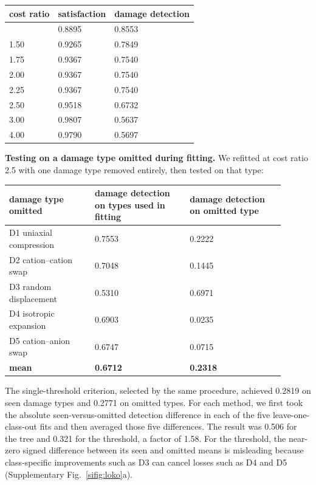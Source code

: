 {\def\LTcaptype{none} %
\begin{longtable}[]{@{}lll@{}}
\toprule\noalign{}
cost ratio & satisfaction & damage detection \\
\midrule\noalign{}
\endhead
\bottomrule\noalign{}
\endlastfoot
1.00 & 0.8895 & 0.8553 \\
1.50 & 0.9265 & 0.7849 \\
1.75 & 0.9367 & 0.7540 \\
2.00 & 0.9367 & 0.7540 \\
2.25 & 0.9367 & 0.7540 \\
2.50 & 0.9518 & 0.6732 \\
3.00 & 0.9807 & 0.5637 \\
4.00 & 0.9790 & 0.5697 \\
\end{longtable}
}

\textbf{Testing on a damage type omitted during fitting.} We refitted at cost ratio 2.5
with one damage type removed entirely, then tested on that type:

{\def\LTcaptype{none} %
\begin{longtable}[]{@{}p{0.28\linewidth}p{0.31\linewidth}p{0.31\linewidth}@{}}
\toprule\noalign{}
damage type omitted & damage detection on types used in fitting & damage detection on omitted type \\
\midrule\noalign{}
\endhead
\bottomrule\noalign{}
\endlastfoot
D1 uniaxial compression & 0.7553 & 0.2222 \\
D2 cation--cation swap & 0.7048 & 0.1445 \\
D3 random displacement & 0.5310 & 0.6971 \\
D4 isotropic expansion & 0.6903 & 0.0235 \\
D5 cation--anion swap & 0.6747 & 0.0715 \\
\textbf{mean} & \textbf{0.6712} & \textbf{0.2318} \\
\end{longtable}
}

The single-threshold criterion, selected by the same procedure, achieved 0.2819
on seen damage types and 0.2771 on omitted types. For each method, we first took the
absolute seen-versus-omitted detection difference in each of the five leave-one-class-out
fits and then averaged those five differences. The result was 0.506 for the tree and 0.321
for the threshold, a factor of 1.58. For the threshold, the near-zero signed difference
between its seen and omitted means is misleading because class-specific improvements such
as D3 can cancel losses such as D4 and D5 (Supplementary Fig.~\ref{sifig:loko}a).

